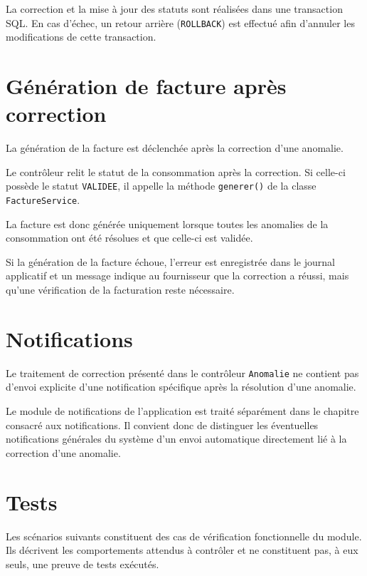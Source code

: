 La correction et la mise à jour des statuts sont réalisées dans une transaction SQL. En cas d'échec, un retour arrière (\texttt{ROLLBACK}) est effectué afin d'annuler les modifications de cette transaction.

\section{Génération de facture après correction}

La génération de la facture est déclenchée après la correction d'une anomalie.

Le contrôleur relit le statut de la consommation après la correction. Si celle-ci possède le statut \texttt{VALIDEE}, il appelle la méthode \texttt{generer()} de la classe \texttt{FactureService}.

La facture est donc générée uniquement lorsque toutes les anomalies de la consommation ont été résolues et que celle-ci est validée.

Si la génération de la facture échoue, l'erreur est enregistrée dans le journal applicatif et un message indique au fournisseur que la correction a réussi, mais qu'une vérification de la facturation reste nécessaire.

\section{Notifications}

Le traitement de correction présenté dans le contrôleur \texttt{Anomalie} ne contient pas d'envoi explicite d'une notification spécifique après la résolution d'une anomalie.

Le module de notifications de l'application est traité séparément dans le chapitre consacré aux notifications. Il convient donc de distinguer les éventuelles notifications générales du système d'un envoi automatique directement lié à la correction d'une anomalie.

\section{Tests}

Les scénarios suivants constituent des cas de vérification fonctionnelle du module. Ils décrivent les comportements attendus à contrôler et ne constituent pas, à eux seuls, une preuve de tests exécutés.

